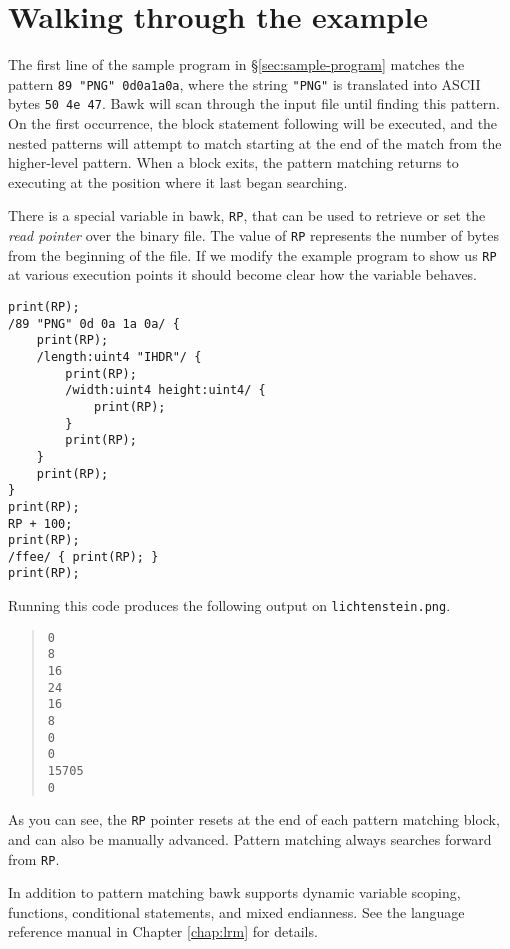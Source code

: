 \section{Walking through the example}
The first line of the sample program in \S\ref{sec:sample-program} matches the pattern \texttt{89 "PNG" 0d0a1a0a}, where the string \texttt{"PNG"} is translated into ASCII bytes \texttt{50 4e 47}.  Bawk will scan through the input file until finding this pattern.  On the first occurrence, the block statement following will be executed, and the nested patterns will attempt to match starting at the end of the match from the higher-level pattern.  When a block exits, the pattern matching returns to executing at the position where it last began searching.

There is a special variable in bawk, \texttt{RP}, that can be used to retrieve or set the \emph{read pointer} over the binary file.  The value of \texttt{RP} represents the number of bytes from the beginning of the file.  If we modify the example program to show us \texttt{RP} at various execution points it should become clear how the variable behaves.
\begin{lstlisting}[caption=Showing how RP works]
print(RP);
/89 "PNG" 0d 0a 1a 0a/ {
	print(RP);
	/length:uint4 "IHDR"/ {
		print(RP);
		/width:uint4 height:uint4/ {
			print(RP);
		}
		print(RP);
	}
	print(RP);
}
print(RP);
RP + 100;
print(RP);
/ffee/ { print(RP); }
print(RP);
\end{lstlisting}
Running this code produces the following output on \texttt{lichtenstein.png}.
\begin{quote}\begin{verbatim}
0
8
16
24
16
8
0
0
15705
0
\end{verbatim}\end{quote}
As you can see, the \texttt{RP} pointer resets at the end of each pattern matching block, and can also be manually advanced.  Pattern matching always searches forward from \texttt{RP}.

In addition to pattern matching bawk supports dynamic variable scoping, functions, conditional statements, and mixed endianness.  See the language reference manual in Chapter \ref{chap:lrm} for details.
